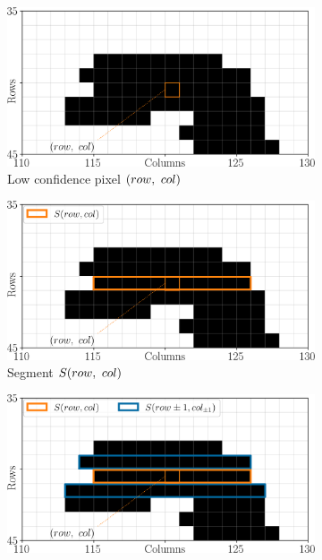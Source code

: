 \begin{figure}
    \begin{subfigure}[t]{0.5\linewidth}
        \flushleft
        \includegraphics[width=\linewidth]{Images/Chap_5/low_confidence_segments_1.png}
        \caption{Low confidence pixel $(row, ~col)$}
        \label{fig:low_confidence_segments_1}
    \end{subfigure}
    \begin{subfigure}[t]{0.5\linewidth}
        \flushright
        \includegraphics[width=\linewidth]{Images/Chap_5/low_confidence_segments_2.png}
        \caption{Segment $S(row, ~col)$}
        \label{fig:low_confidence_segments_2}
    \end{subfigure}\vspace*{0.3cm}
    \begin{subfigure}[t]{0.5\linewidth}
        \flushleft
        \includegraphics[width=\linewidth]{Images/Chap_5/low_confidence_segments_3.png}

\end{subfigure}
\end{figure}
